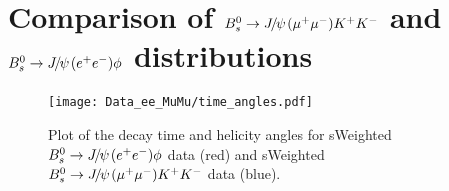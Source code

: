 \clearpage

\section{Comparison of $\Bs\to\jpsi(\mumu)\Kp\Km$ and $\Bs\to\jpsi(\epem)\phi$ distributions}\label{sec:app:Comparison}

 \begin{figure}[htb]
  \begin{center}
    \texttt{[image: Data\_ee\_MuMu/time\_angles.pdf]} \\
  \end{center}
  \caption{
   Plot of the decay time and helicity angles for sWeighted $\Bs\to\jpsi(\epem)\phi$ data (red) and sWeighted $\Bs\to\jpsi(\mumu)\Kp\Km$ data (blue).
}
  \label{fig:BDTvariables}
\end{figure}
\clearpage